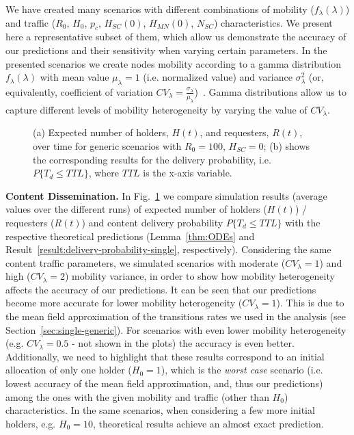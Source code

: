 \documentclass[10pt,conference,letterpaper]{IEEEtran}
\begin{document}
We have created many scenarios with different combinations of mobility ($f_{\lambda}(\lambda)$) and traffic ($R_{0}$, $H_{0}$, $p_{c}$, $H_{SC}(0)$, $H_{MN}(0)$, $N_{SC}$) characteristics. We present here a representative subset of them, which allow us demonstrate the accuracy of our predictions and their sensitivity when varying certain parameters. In the presented scenarios we create nodes mobility according to a gamma distribution $f_{\lambda}(\lambda)$ with mean value $\mu_{\lambda}=1$ (i.e. normalized value) and variance $\sigma_{\lambda}^{2}$ (or, equivalently, coefficient of variation $CV_{\lambda} = \frac{\sigma_{\lambda}}{\mu_{\lambda}}$)~\cite{passarella-dunbar-journal}. Gamma distributions allow us to capture different levels of mobility heterogeneity by varying the value of $CV_{\lambda}$. 


\begin{figure}
\caption{(a) Expected number of holders, $H(t)$, and requesters, $R(t)$, over time for generic scenarios with $R_{0}=100$, $H_{SC}=0$; (b) shows the corresponding results for the delivery probability, i.e. $P\{T_{d}\leq TTL\}$, where $TTL$ is the x-axis variable.}
\label{fig:synthetic-H(t)-Prob}
\end{figure}

\textbf{Content Dissemination.} In Fig.~\ref{fig:synthetic-H(t)-Prob} we compare simulation results (average values over the different runs) of expected number of holders ($H(t)$) / requesters ($R(t)$) and content delivery probability $P\{T_{d}\leq TTL\}$ with the respective theoretical predictions (Lemma~\ref{thm:ODEs} and Result~\ref{result:delivery-probability-single}, respectively). Considering the same content traffic parameters, we simulated scenarios with moderate ($CV_{\lambda}=1$) and high ($CV_{\lambda}=2$) mobility variance, in order to show how mobility heterogeneity affects the accuracy of our predictions. It can be seen that our predictions become more accurate for lower mobility heterogeneity ($CV_{\lambda}=1$). This is due to the mean field approximation of the transitions rates we used in the analysis (see Section~\ref{sec:single-generic}). For scenarios with even lower mobility heterogeneity (e.g. $CV_{\lambda}=0.5$ - not shown in the plots) the accuracy is even better. Additionally, we need to highlight that these results correspond to an initial allocation of only one holder ($H_{0}=1$), which is the \textit{worst case} scenario (i.e. lowest accuracy of the mean field approximation, and, thus our predictions) among the ones with the given mobility and traffic (other than $H_{0}$) characteristics. In the same scenarios, when considering a few more initial holders, e.g. $H_{0}=10$, theoretical results achieve an almost exact prediction. 
\end{document}
